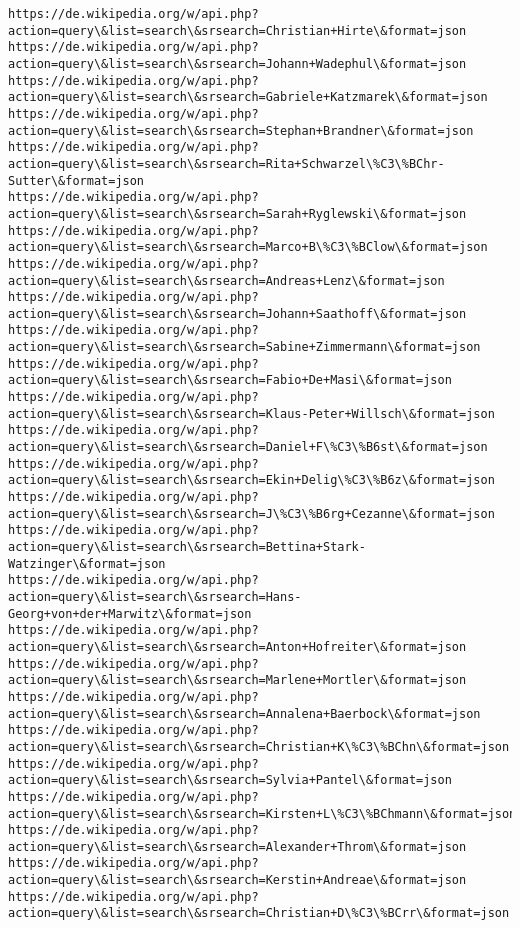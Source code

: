 \documentclass[11pt]{article}
\begin{document}
\begin{Verbatim}[commandchars=\\\{\}]
https://de.wikipedia.org/w/api.php?action=query\&list=search\&srsearch=Christian+Hirte\&format=json
https://de.wikipedia.org/w/api.php?action=query\&list=search\&srsearch=Johann+Wadephul\&format=json
https://de.wikipedia.org/w/api.php?action=query\&list=search\&srsearch=Gabriele+Katzmarek\&format=json
https://de.wikipedia.org/w/api.php?action=query\&list=search\&srsearch=Stephan+Brandner\&format=json
https://de.wikipedia.org/w/api.php?action=query\&list=search\&srsearch=Rita+Schwarzel\%C3\%BChr-Sutter\&format=json
https://de.wikipedia.org/w/api.php?action=query\&list=search\&srsearch=Sarah+Ryglewski\&format=json
https://de.wikipedia.org/w/api.php?action=query\&list=search\&srsearch=Marco+B\%C3\%BClow\&format=json
https://de.wikipedia.org/w/api.php?action=query\&list=search\&srsearch=Andreas+Lenz\&format=json
https://de.wikipedia.org/w/api.php?action=query\&list=search\&srsearch=Johann+Saathoff\&format=json
https://de.wikipedia.org/w/api.php?action=query\&list=search\&srsearch=Sabine+Zimmermann\&format=json
https://de.wikipedia.org/w/api.php?action=query\&list=search\&srsearch=Fabio+De+Masi\&format=json
https://de.wikipedia.org/w/api.php?action=query\&list=search\&srsearch=Klaus-Peter+Willsch\&format=json
https://de.wikipedia.org/w/api.php?action=query\&list=search\&srsearch=Daniel+F\%C3\%B6st\&format=json
https://de.wikipedia.org/w/api.php?action=query\&list=search\&srsearch=Ekin+Delig\%C3\%B6z\&format=json
https://de.wikipedia.org/w/api.php?action=query\&list=search\&srsearch=J\%C3\%B6rg+Cezanne\&format=json
https://de.wikipedia.org/w/api.php?action=query\&list=search\&srsearch=Bettina+Stark-Watzinger\&format=json
https://de.wikipedia.org/w/api.php?action=query\&list=search\&srsearch=Hans-Georg+von+der+Marwitz\&format=json
https://de.wikipedia.org/w/api.php?action=query\&list=search\&srsearch=Anton+Hofreiter\&format=json
https://de.wikipedia.org/w/api.php?action=query\&list=search\&srsearch=Marlene+Mortler\&format=json
https://de.wikipedia.org/w/api.php?action=query\&list=search\&srsearch=Annalena+Baerbock\&format=json
https://de.wikipedia.org/w/api.php?action=query\&list=search\&srsearch=Christian+K\%C3\%BChn\&format=json
https://de.wikipedia.org/w/api.php?action=query\&list=search\&srsearch=Sylvia+Pantel\&format=json
https://de.wikipedia.org/w/api.php?action=query\&list=search\&srsearch=Kirsten+L\%C3\%BChmann\&format=json
https://de.wikipedia.org/w/api.php?action=query\&list=search\&srsearch=Alexander+Throm\&format=json
https://de.wikipedia.org/w/api.php?action=query\&list=search\&srsearch=Kerstin+Andreae\&format=json
https://de.wikipedia.org/w/api.php?action=query\&list=search\&srsearch=Christian+D\%C3\%BCrr\&format=json

\end{Verbatim}
\end{document}
